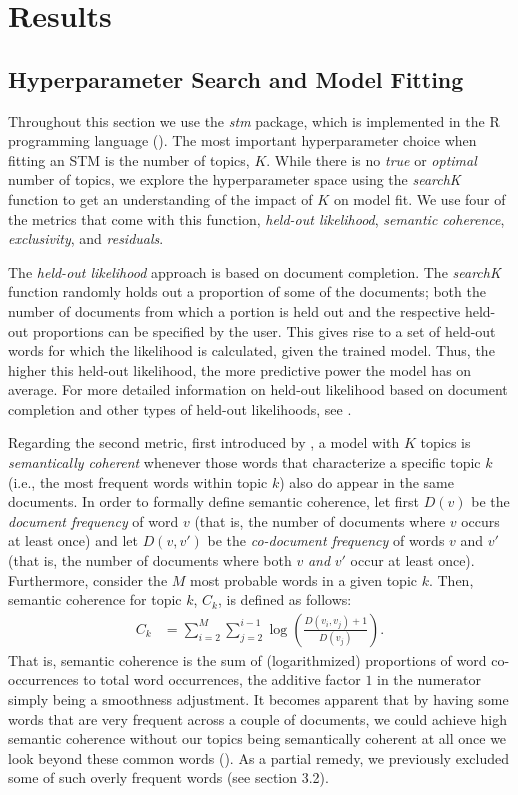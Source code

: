 \section{Results}

\subsection{Hyperparameter Search and Model Fitting}

Throughout this section we use the \textit{stm} package, which is implemented in the R programming language (\citealp{stm}). The most important hyperparameter choice when fitting an STM is the number of topics, $K$. While there is no \textit{true} or \textit{optimal} number of topics, we explore the hyperparameter space using the \textit{searchK} function to get an understanding of the impact of $K$ on model fit. We use four of the metrics that come with this function, \textit{held-out likelihood}, \textit{semantic coherence}, \textit{exclusivity}, and \textit{residuals}.

The \textit{held-out likelihood} approach is based on document completion. The \textit{searchK} function randomly holds out a proportion of some of the documents; both the number of documents from which a portion is held out and the respective held-out proportions can be specified by the user. This gives rise to a set of held-out words for which the likelihood is calculated, given the trained model. Thus, the higher this held-out likelihood, the more predictive power the model has on average. For more detailed information on held-out likelihood based on document completion and other types of held-out likelihoods, see \cite{wallach2009evaluation}.

Regarding the second metric, first introduced by \cite{mimno2011optimizing}, a model with $K$ topics is \textit{semantically coherent} whenever those words that characterize a specific topic $k$ (i.e., the most frequent words within topic $k$) also do appear in the same documents. In order to formally define semantic coherence, let first $D(v)$ be the \textit{document frequency} of word $v$ (that is, the number of documents where $v$ occurs at least once) and let $D(v, v')$ be the \textit{co-document frequency} of words $v$ and $v'$ (that is, the number of documents where both $v$ \textit{and} $v'$ occur at least once). Furthermore, consider the $M$ most probable words in a given topic $k$. Then, semantic coherence for topic $k$, $C_{k}$, is defined as follows:
\begin{align*}
C_{k} &= \sum_{i=2}^{M}\sum_{j=2}^{i-1}\log(\frac{D(v_{i}, v_{j})+1}{D(v_{j})}).
\end{align*}
That is, semantic coherence is the sum of (logarithmized) proportions of word co-occurrences to total word occurrences, the additive factor $1$ in the numerator simply being a smoothness adjustment. It becomes apparent that by having some words that are very frequent across a couple of documents, we could achieve high semantic coherence without our topics being semantically coherent at all once we look beyond these common words (\citealp{stm, mimno2011optimizing}). As a partial remedy, we previously excluded some of such overly frequent words (see section 3.2).

